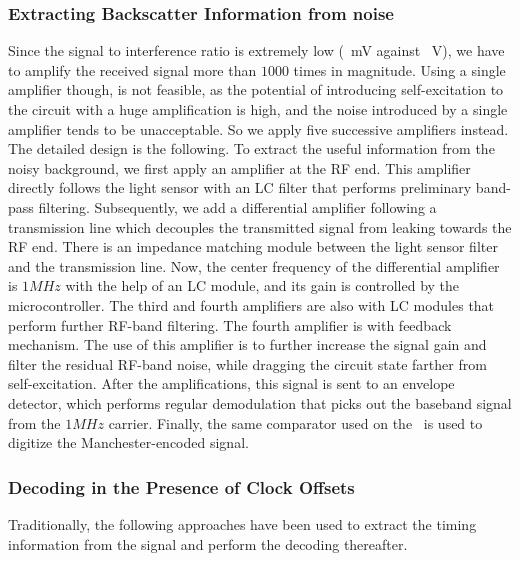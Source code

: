 \subsubsection{Extracting Backscatter Information from noise}
Since the signal to interference ratio is extremely low (~mV against ~V), we have to amplify the received signal more than $1000$ times in magnitude. Using a single amplifier though, is not feasible, as the potential of introducing self-excitation to the circuit with a huge amplification is high, and the noise introduced by a single amplifier tends to be unacceptable. So we apply five successive amplifiers instead. The detailed design is the following. To extract the useful information from the noisy background, we first apply an amplifier at the RF end. This amplifier directly follows the light sensor with an LC filter that performs preliminary band-pass filtering. Subsequently, we add a differential amplifier following a transmission line which decouples the transmitted signal from leaking towards the RF end. There is an impedance matching module between the light sensor filter and the transmission line. Now, the center frequency of the differential amplifier is $1MHz$ with the help of an LC module, and its gain is controlled by the microcontroller. The third and fourth amplifiers are also with LC modules that perform further RF-band filtering. The fourth amplifier is with feedback mechanism. The use of this amplifier is to further increase the signal gain and filter the residual RF-band noise, while dragging the circuit state farther from self-excitation. After the amplifications, this signal is sent to an envelope detector, which performs regular demodulation that picks out the baseband signal from the $1MHz$ carrier. Finally, the same comparator used on the \vitag\ is used to digitize the Manchester-encoded signal.  


\subsubsection{Decoding in the Presence of Clock Offsets}
\label{subsubsec:clockoffset}

Traditionally, the following approaches have been used to extract the timing information from the signal and perform the decoding thereafter.

